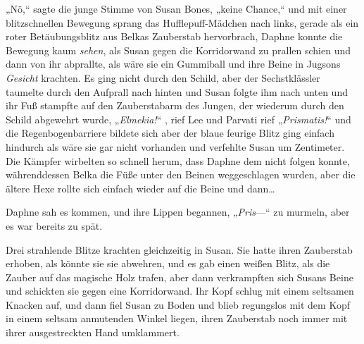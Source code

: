 „Nö,“ sagte die junge Stimme von Susan Bones, „keine Chance,“ und mit einer blitzschnellen Bewegung sprang das Hufflepuff-Mädchen nach links, gerade als ein roter Betäubungsblitz aus Belkas Zauberstab hervorbrach, Daphne konnte die Bewegung kaum \emph{sehen}, als Susan gegen die Korridorwand zu prallen schien und dann von ihr abprallte, als wäre sie ein Gummiball und ihre Beine in Jugsons \emph{Gesicht} krachten. Es ging nicht durch den Schild, aber der Sechstklässler taumelte durch den Aufprall nach hinten und Susan folgte ihm nach unten und ihr Fuß stampfte auf den Zauberstabarm des Jungen, der wiederum durch den Schild abgewehrt wurde, „\emph{Elmekia!}“ , rief Lee und Parvati rief „\emph{Prismatis!}“ und die Regenbogenbarriere bildete sich aber der blaue feurige Blitz ging einfach hindurch als wäre sie gar nicht vorhanden und verfehlte Susan um Zentimeter. Die Kämpfer wirbelten so schnell herum, dass Daphne dem nicht folgen konnte, währenddessen Belka die Füße unter den Beinen weggeschlagen wurden, aber die ältere Hexe rollte sich einfach wieder auf die Beine und dann…

Daphne sah es kommen, und ihre Lippen begannen, „\emph{Pris}—“ zu murmeln, aber es war bereits zu spät.

Drei strahlende Blitze krachten gleichzeitig in Susan. Sie hatte ihren Zauberstab erhoben, als könnte sie sie abwehren, und es gab einen weißen Blitz, als die Zauber auf das magische Holz trafen, aber dann verkrampften sich Susans Beine und schickten sie gegen eine Korridorwand. Ihr Kopf schlug mit einem seltsamen Knacken auf, und dann fiel Susan zu Boden und blieb regungslos mit dem Kopf in einem seltsam anmutenden Winkel liegen, ihren Zauberstab noch immer mit ihrer ausgestreckten Hand umklammert.

